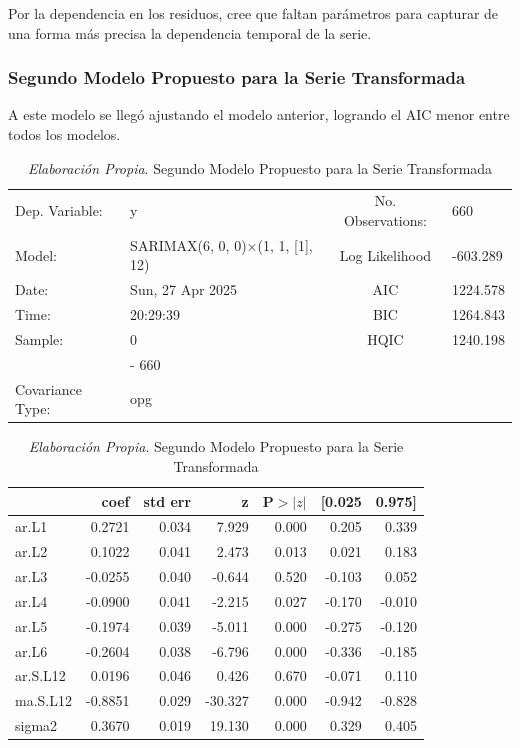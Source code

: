 \documentclass[12pt,letterpaper]{article}   %
\begin{document}
Por la dependencia en los residuos, cree que faltan parámetros para capturar de una forma más precisa la dependencia temporal de la serie.


\newpage
\subsubsection{Segundo Modelo Propuesto para la Serie Transformada}

A este modelo se llegó ajustando el modelo anterior, logrando el AIC menor entre todos los modelos.

\begin{table}[htbp]
\centering
\tiny
\caption{\textit{Elaboración Propia}. Segundo Modelo Propuesto para la Serie Transformada}
\begin{tabular}{llcl}
\toprule
Dep. Variable: & y & No. Observations: & 660 \\
Model: & SARIMAX(6, 0, 0)$\times$(1, 1, [1], 12) & Log Likelihood & -603.289 \\
Date: & Sun, 27 Apr 2025 & AIC & 1224.578 \\
Time: & 20:29:39 & BIC & 1264.843 \\
Sample: & 0 & HQIC & 1240.198 \\
        & - 660 & & \\
Covariance Type: & opg & & \\
\bottomrule
\end{tabular}

\vspace{0.3cm}

\begin{tabular}{lrrrrrr}
\toprule
 & \textbf{coef} & \textbf{std err} & \textbf{z} & \textbf{P$>|z|$} & \textbf{[0.025} & \textbf{0.975]} \\
\midrule
ar.L1     & 0.2721 & 0.034 & 7.929 & 0.000 & 0.205 & 0.339 \\
ar.L2     & 0.1022 & 0.041 & 2.473 & 0.013 & 0.021 & 0.183 \\
ar.L3     & -0.0255 & 0.040 & -0.644 & 0.520 & -0.103 & 0.052 \\
ar.L4     & -0.0900 & 0.041 & -2.215 & 0.027 & -0.170 & -0.010 \\
ar.L5     & -0.1974 & 0.039 & -5.011 & 0.000 & -0.275 & -0.120 \\
ar.L6     & -0.2604 & 0.038 & -6.796 & 0.000 & -0.336 & -0.185 \\
ar.S.L12  & 0.0196 & 0.046 & 0.426  & 0.670 & -0.071 & 0.110 \\
ma.S.L12  & -0.8851 & 0.029 & -30.327 & 0.000 & -0.942 & -0.828 \\
sigma2    & 0.3670 & 0.019 & 19.130 & 0.000 & 0.329 & 0.405 \\
\bottomrule
\end{tabular}


\end{table}
\end{document}
